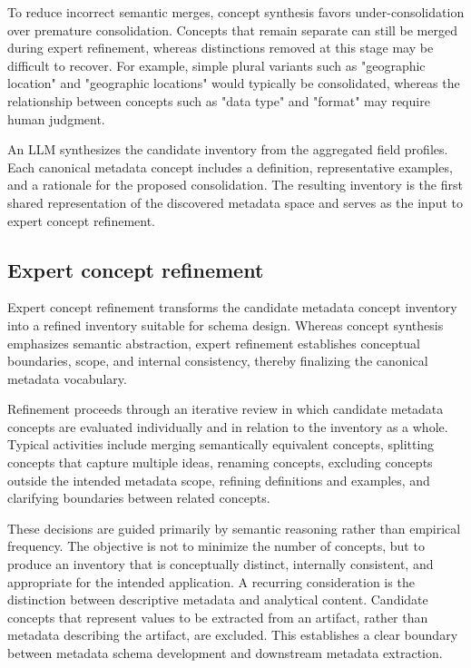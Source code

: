 \documentclass{article}
\begin{document}
To reduce incorrect semantic merges, concept synthesis favors under-consolidation over premature consolidation. Concepts that remain separate can still be merged during expert refinement, whereas distinctions removed at this stage may be difficult to recover. For example, simple plural variants such as "geographic location" and "geographic locations" would typically be consolidated, whereas the relationship between concepts such as "data type" and "format" may require human judgment.

An LLM synthesizes the candidate inventory from the aggregated field profiles. Each canonical metadata concept includes a definition, representative examples, and a rationale for the proposed consolidation. The resulting inventory is the first shared representation of the discovered metadata space and serves as the input to expert concept refinement.

\subsection{Expert concept refinement}

Expert concept refinement transforms the candidate metadata concept inventory into a refined inventory suitable for schema design. Whereas concept synthesis emphasizes semantic abstraction, expert refinement establishes conceptual boundaries, scope, and internal consistency, thereby finalizing the canonical metadata vocabulary.

Refinement proceeds through an iterative review in which candidate metadata concepts are evaluated individually and in relation to the inventory as a whole. Typical activities include merging semantically equivalent concepts, splitting concepts that capture multiple ideas, renaming concepts, excluding concepts outside the intended metadata scope, refining definitions and examples, and clarifying boundaries between related concepts.

These decisions are guided primarily by semantic reasoning rather than empirical frequency. The objective is not to minimize the number of concepts, but to produce an inventory that is conceptually distinct, internally consistent, and appropriate for the intended application. A recurring consideration is the distinction between descriptive metadata and analytical content. Candidate concepts that represent values to be extracted from an artifact, rather than metadata describing the artifact, are excluded. This establishes a clear boundary between metadata schema development and downstream metadata extraction.
\end{document}
